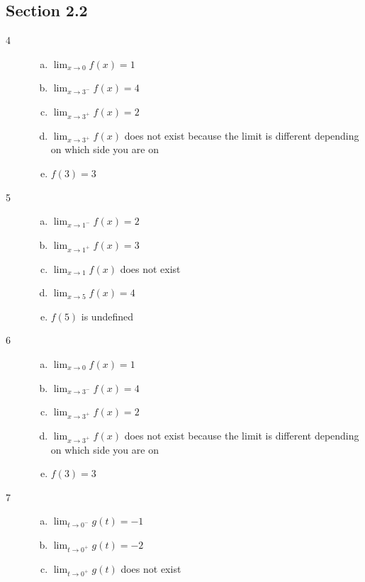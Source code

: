 \documentclass[letterpaper, landscape]{exam}
\begin{document}
    \subsection{Section 2.2}
    \begin{description}

      \item[4]
        \begin{enumerate}[(a)]
          \item $\lim_{x \to 0} f(x) = 1$
          \item $\lim_{x \to 3^-} f(x) = 4$
          \item $\lim_{x \to 3^+} f(x) = 2$
          \item $\lim_{x \to 3^+} f(x)$ does not exist because the limit is
            different depending on which side you are on
          \item $f(3) = 3$
        \end{enumerate}

      \item[5]
        \begin{enumerate}[(a)]
          \item $\lim_{x \to 1^-} f(x) = 2$
          \item $\lim_{x \to 1^+} f(x) = 3$
          \item $\lim_{x \to 1} f(x)$ does not exist
          \item $\lim_{x \to 5} f(x) = 4$
          \item $f(5)$ is undefined
        \end{enumerate}

      \item[6]
        \begin{enumerate}[(a)]
          \item $\lim_{x \to 0} f(x) = 1$
          \item $\lim_{x \to 3^-} f(x) = 4$
          \item $\lim_{x \to 3^+} f(x) = 2$
          \item $\lim_{x \to 3^+} f(x)$ does not exist because the limit is
            different depending on which side you are on
          \item $f(3) = 3$
        \end{enumerate}

      \item[7]
        \begin{enumerate}[(a)]
          \item $\lim_{t \to 0^-} g(t) = -1$
          \item $\lim_{t \to 0^+} g(t) = -2$
          \item $\lim_{t \to 0^+} g(t)$ does not exist


\end{enumerate}
\end{description}
\end{document}
